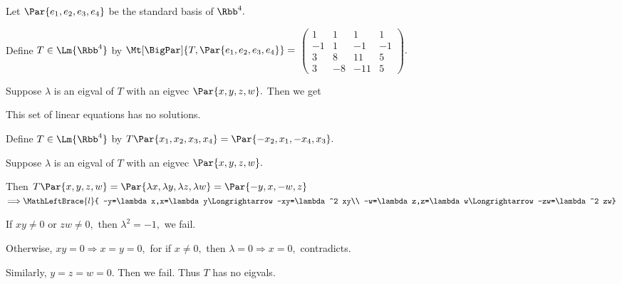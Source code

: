 \par\quad
Let $\Par{e_1,e_2,e_3,e_4}$ be the standard basis of $\Rbb^4.$\vspace{-6pt}\par\quad
Define $T\in\Lm{\Rbb^4}$ by $\Mt[\BigPar]{T,\Par{e_1,e_2,e_3,e_4}}={}${\normalsize$\begin{pmatrix}
		1 & 1 & 1 & 1\\
		-1 & 1 & -1 & -1\\
		3 & 8 & 11 & 5\\
		3 & -8 & -11 & 5
	\end{pmatrix}.$}\vspace{-12pt}\par\quad
Suppose $\lambda$ is an eigval of $T$ with an eigvec $\Par{x,y,z,w}.$ Then we get \vspace{-8pt}\par\quad
This set of linear equations has no solutions.\par\quad
{}\large\par\vspace{6pt}\quad
\Or Define $T\in\Lm{\Rbb^4}$ by $T\Par{x_1,x_2,x_3,x_4}=\Par{-x_2,x_1,-x_4,x_3}.$\par\quad
Suppose $\lambda$ is an eigval of $T$ with an eigvec $\Par{x,y,z,w}.$\vspace{-3pt}\par\quad
Then $T\Par{x,y,z,w}=\Par{\lambda x,\lambda y,\lambda z,\lambda w}=\Par{-y,x,-w,z}$ { $\Longrightarrow\MathLeftBrace{l}{
		-y=\lambda x,x=\lambda y\Longrightarrow-xy=\lambda^2 xy\\
		-w=\lambda z,z=\lambda w\Longrightarrow-zw=\lambda^2 zw}$}\vspace{-3pt}\par\quad
If $xy\neq 0$ or $zw\neq 0,$ then $\lambda^2=-1,$ we fail.\par\quad
Otherwise, $xy=0\Rightarrow x=y=0,$ for if $x\neq 0,$ then $\lambda=0\Rightarrow x=0,$ contradicts.\par\quad
Similarly, $y=z=w=0.$ Then we fail. Thus $T$ has no eigvals.\PfEnd
\SepLine

